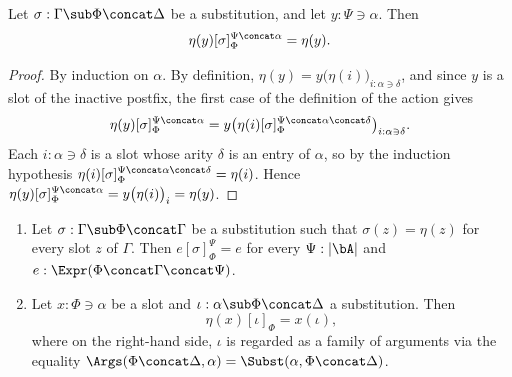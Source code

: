 \begin{lemma}\label{lem:eta-depth}
    Let $\sigma : \Gamma \sub \Phi \concat \Delta$ be a substitution, and let $y : \Psi \ni \alpha$. Then
    \[
    \eta(y)[\sigma]_\Phi^{\Psi \concat \alpha} = \eta(y).
    \]
\end{lemma}

\begin{proof}
    By induction on $\alpha$. By definition, $\eta(y) = y\big(\eta(i)\big)_{i : \alpha \ni \delta}$, and since $y$ is a slot of the inactive postfix, the first case of the definition of the action gives
    \[
    \eta(y)[\sigma]_\Phi^{\Psi \concat \alpha} = y\big(\eta(i)[\sigma]_\Phi^{\Psi \concat \alpha \concat \delta}\big)_{i : \alpha \ni \delta}.
    \]
    Each $i : \alpha \ni \delta$ is a slot whose arity $\delta$ is an entry of $\alpha$, so by the induction hypothesis $\eta(i)[\sigma]_\Phi^{\Psi \concat \alpha \concat \delta} = \eta(i)$. Hence $\eta(y)[\sigma]_\Phi^{\Psi \concat \alpha} = y\big(\eta(i)\big)_{i} = \eta(y)$.
\end{proof}

\begin{lemma}\label{lem:identity-like}
    \begin{enumerate}
        \item Let $\sigma : \Gamma \sub \Phi \concat \Gamma$ be a substitution such that $\sigma(z) = \eta(z)$ for every slot $z$ of $\Gamma$. Then $e[\sigma]_\Phi^\Psi = e$ for every $\Psi : \left|\bA\right|$ and $e : \Expr(\Phi\concat\Gamma\concat\Psi)$.
        \item Let $x : \Phi \ni \alpha$ be a slot and $\iota : \alpha \sub \Phi \concat \Delta$ a substitution. Then
        \[
        \eta(x)[\iota]_\Phi = x(\iota),
        \]
        where on the right-hand side, $\iota$ is regarded as a family of arguments via the equality $\Args(\Phi \concat \Delta, \alpha) = \Subst(\alpha, \Phi \concat \Delta)$.
    \end{enumerate}
\end{lemma}

